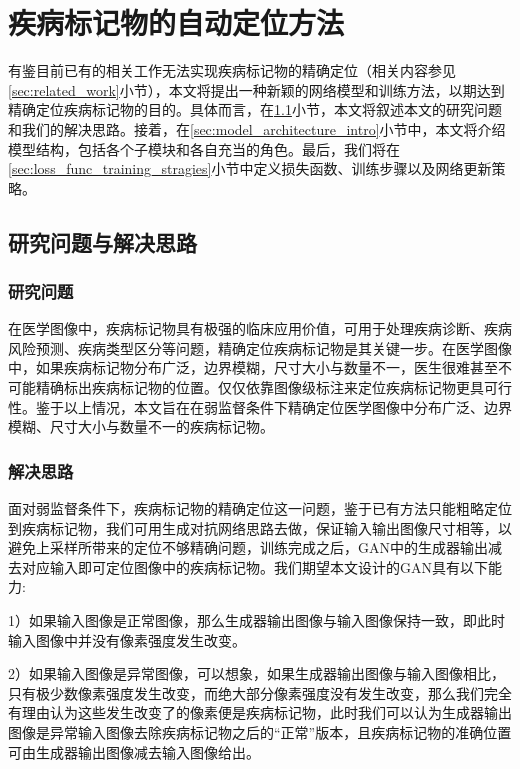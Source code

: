 \chapter{疾病标记物的自动定位方法}\label{sec:method}
有鉴目前已有的相关工作无法实现疾病标记物的精确定位（相关内容参见\ref{sec:related_work}小节），本文将提出一种新颖的网络模型和训练方法，以期达到精确定位疾病标记物的目的。具体而言，在\ref{sec:idea_thinking}小节，本文将叙述本文的研究问题和我们的解决思路。接着，在\ref{sec:model_architecture_intro}小节中，本文将介绍模型结构，包括各个子模块和各自充当的角色。最后，我们将在\ref{sec:loss_func_training_stragies}小节中定义损失函数、训练步骤以及网络更新策略。

\section{研究问题与解决思路}\label{sec:idea_thinking}
\subsection{研究问题}
在医学图像中，疾病标记物具有极强的临床应用价值，可用于处理疾病诊断、疾病风险预测、疾病类型区分等问题，精确定位疾病标记物是其关键一步。在医学图像中，如果疾病标记物分布广泛，边界模糊，尺寸大小与数量不一，医生很难甚至不可能精确标出疾病标记物的位置。仅仅依靠图像级标注来定位疾病标记物更具可行性。鉴于以上情况，本文旨在在弱监督条件下精确定位医学图像中分布广泛、边界模糊、尺寸大小与数量不一的疾病标记物。
\subsection{解决思路}
面对弱监督条件下，疾病标记物的精确定位这一问题，鉴于已有方法只能粗略定位到疾病标记物，我们可用生成对抗网络思路去做，保证输入输出图像尺寸相等，以避免上采样所带来的定位不够精确问题，训练完成之后，GAN中的生成器输出减去对应输入即可定位图像中的疾病标记物。我们期望本文设计的GAN具有以下能力:

1）如果输入图像是正常图像，那么生成器输出图像与输入图像保持一致，即此时输入图像中并没有像素强度发生改变。
	
2）如果输入图像是异常图像，可以想象，如果生成器输出图像与输入图像相比，只有极少数像素强度发生改变，而绝大部分像素强度没有发生改变，那么我们完全有理由认为这些发生改变了的像素便是疾病标记物，此时我们可以认为生成器输出图像是异常输入图像去除疾病标记物之后的“正常”版本，且疾病标记物的准确位置可由生成器输出图像减去输入图像给出。

